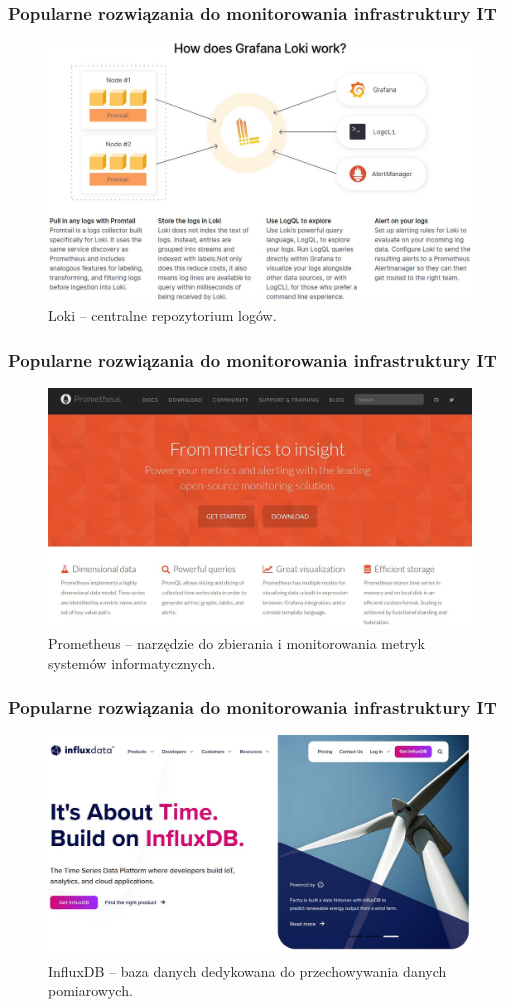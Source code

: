 \documentclass[]{beamer}
\begin{document}
\begin{frame}
  \frametitle{Popularne rozwiązania do monitorowania infrastruktury IT}
  \begin{figure}
    \centering
    \includegraphics[width=0.8\linewidth]{loki.jpg}
    \caption{Loki -- centralne repozytorium logów.}
  \end{figure}
\end{frame}


\begin{frame}
  \frametitle{Popularne rozwiązania do monitorowania infrastruktury IT}
  \begin{figure}
    \centering
    \includegraphics[width=0.8\linewidth]{prometheus.jpg}
    \caption{Prometheus -- narzędzie do zbierania i monitorowania metryk systemów informatycznych.}
  \end{figure}
\end{frame}


\begin{frame}
  \frametitle{Popularne rozwiązania do monitorowania infrastruktury IT}
  \begin{figure}
    \centering
    \includegraphics[width=0.9\linewidth]{influxdb.jpg}
    \caption{InfluxDB -- baza danych dedykowana do przechowywania danych pomiarowych.}
  \end{figure}
\end{frame}
\end{document}
